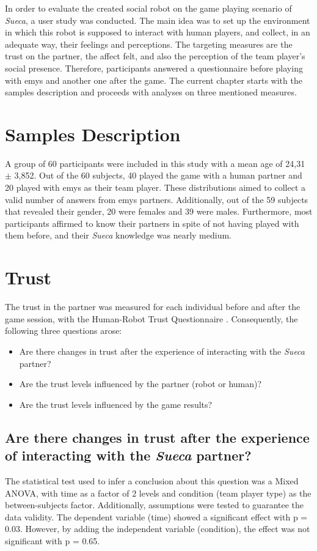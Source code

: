 \label{chapter:results}

In order to evaluate the created social robot on the game playing scenario of \emph{Sueca}, a user study was conducted.
The main idea was to set up the environment in which this robot is supposed to interact with human players, and collect, in an adequate way, their feelings and perceptions.
The targeting measures are the trust on the partner, the affect felt, and also the perception of the team player's social presence.
Therefore, participants answered a questionnaire before playing with \ac{emys} and another one after the game.
The current chapter starts with the samples description and proceeds with analyses on three mentioned measures.


\section{Samples Description}
\label{sec:samples}
A group of 60 participants were included in this study with a mean age of 24,31 $\pm$ 3,852.
Out of the 60 subjects, 40 played the game with a human partner and 20 played with \ac{emys} as their team player.
These distributions aimed to collect a valid number of answers from \ac{emys} partners.
Additionally, out of the 59 subjects that revealed their gender, 20 were females and 39 were males.
Furthermore, most participants affirmed to know their partners in spite of not having played with them before, and their \emph{Sueca} knowledge was nearly medium.

\section{Trust}
\label{sec:trust}
The trust in the partner was measured for each individual before and after the game session, with the Human-Robot Trust Questionnaire \cite{}.
Consequently, the following three questions arose:
\begin{itemize}
\item Are there changes in trust after the experience of interacting with the \emph{Sueca} partner?
\item Are the trust levels influenced by the partner (robot or human)?
\item Are the trust levels influenced by the game results?
\end{itemize}


\subsection*{Are there changes in trust after the experience of interacting with the \emph{Sueca} partner?}
The statistical test used to infer a conclusion about this question was a Mixed ANOVA, with time as a factor of 2 levels and condition (team player type) as the between-subjects factor.
Additionally, assumptions were tested to guarantee the data validity.
The dependent variable (time) showed a significant effect with p = 0.03.
However, by adding the independent variable (condition), the effect was not significant with p = 0.65.

